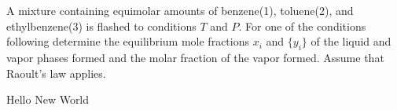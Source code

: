 \documentclass{article}
\begin{document}
\tableofcontents

A mixture containing equimolar amounts of benzene(1), toluene(2), and
ethylbenzene(3) is flashed to conditions $T$ and $P$. For one of the
conditions following determine the equilibrium mole fractions
{$x_{i}$} and $\{y_{i}\}$ of the liquid and vapor phases formed and
the molar fraction  of the vapor formed. Assume that
Raoult's law applies.
\begin{SOLUTION}
  Hello New World
\end{SOLUTION}
\end{document}
